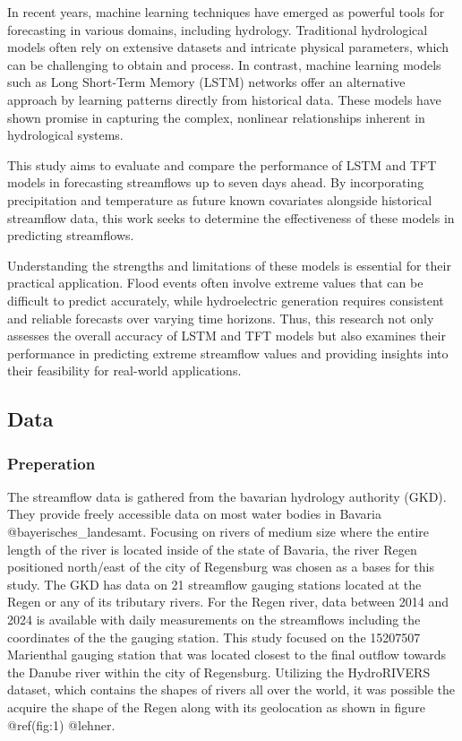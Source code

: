 \documentclass[
]{article}
\begin{document}
In recent years, machine learning techniques have emerged as powerful
tools for forecasting in various domains, including hydrology.
Traditional hydrological models often rely on extensive datasets and
intricate physical parameters, which can be challenging to obtain and
process. In contrast, machine learning models such as Long Short-Term
Memory (LSTM) networks offer an alternative approach by learning
patterns directly from historical data. These models have shown promise
in capturing the complex, nonlinear relationships inherent in
hydrological systems.

This study aims to evaluate and compare the performance of LSTM and TFT
models in forecasting streamflows up to seven days ahead. By
incorporating precipitation and temperature as future known covariates
alongside historical streamflow data, this work seeks to determine the
effectiveness of these models in predicting streamflows.

Understanding the strengths and limitations of these models is essential
for their practical application. Flood events often involve extreme
values that can be difficult to predict accurately, while hydroelectric
generation requires consistent and reliable forecasts over varying time
horizons. Thus, this research not only assesses the overall accuracy of
LSTM and TFT models but also examines their performance in predicting
extreme streamflow values and providing insights into their feasibility
for real-world applications.

\hypertarget{data}{%
\subsection{Data}\label{data}}

\hypertarget{preperation}{%
\subsubsection{Preperation}\label{preperation}}

The streamflow data is gathered from the bavarian hydrology authority
(GKD). They provide freely accessible data on most water bodies in
Bavaria @bayerisches\_landesamt. Focusing on rivers of medium size where
the entire length of the river is located inside of the state of
Bavaria, the river Regen positioned north/east of the city of Regensburg
was chosen as a bases for this study. The GKD has data on 21 streamflow
gauging stations located at the Regen or any of its tributary rivers.
For the Regen river, data between 2014 and 2024 is available with daily
measurements on the streamflows including the coordinates of the the
gauging station. This study focused on the 15207507 Marienthal gauging
station that was located closest to the final outflow towards the Danube
river within the city of Regensburg. Utilizing the HydroRIVERS dataset,
which contains the shapes of rivers all over the world, it was possible
the acquire the shape of the Regen along with its geolocation as shown
in figure @ref(fig:1) @lehner.
\end{document}

